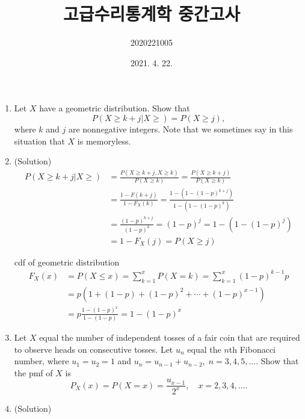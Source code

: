 \documentclass{oblivoir}
\title{ \Huge \textbf{고급수리통계학 중간고사} \vspace{2cm} }
\author{\huge 2020221005 \\ \huge오재권 \vspace{14cm}}
\date{\Large 2021. 4. 22.}
\begin{document}
\maketitle

\newpage
\begin{enumerate}
\item
Let $X$ have a geometric distribution. Show that
$$
P(X \geq k + j | X \geq) = P(X \geq j),
$$
where $k$ and $j$ are nonnegative integers. Note that we sometimes say in this
situation that $X$ is memoryless.

\item[] (Solution)
\begin{align*}
P(X \geq k + j | X \geq) &= \frac{P(X \geq k+j, X \geq k)}{P(X \geq k)} = \frac{P(X \geq k+j)}{P(X \geq k)} \\
&= \frac{1-F(k+j)}{1-F_X(k)} = \frac{1 - (1 - (1-p)^{k+j})}{1 - (1 - (1-p)^k)} \\
&= \frac{(1-p)^{k+j}}{(1-p)^{k}} = (1-p)^j = 1-(1-(1-p)^j) \\
&= 1 - F_X(j) = P(X \geq j)
\end{align*}
\begin{myframe}{cdf of geometric distribution}
\begin{align*}
F_X(x) &= P(X \leq x) = \sum_{k=1}^{x} P(X=k)  = \sum_{k=1}^{x} (1-p)^{k-1} p \\
&= p(1 + (1-p) + (1 - p)^2 + \cdots + (1-p)^{x-1}) \\
&= p \frac{1-(1-p)^x}{1-(1-p)} = 1-(1-p)^x
\end{align*}
\end{myframe}

\item
Let $X$ equal the number of independent tosses of a fair coin that are required
to observe heads on consecutive tosses. Let $u_n$ equal the $n$th Fibonacci number,
where $u_1 = u_2 = 1$ and $u_n = u_{n-1} + u_{n-2}, \; n = 3, 4, 5, \ldots$. Show that
the pmf of $X$ is
$$
P_X(x) = P(X=x) = \frac{u_{x - 1}}{2^x}, \quad x = 2,3,4,\ldots.
$$

\item[] (Solution)


\end{enumerate}
\end{document}
